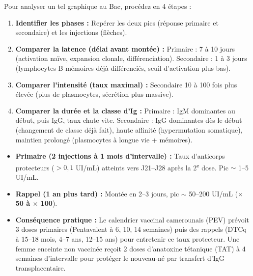 \documentclass[11pt]{article}
\begin{document}
\begin{methode}
Pour analyser un tel graphique au Bac, procédez en 4 étapes :
\begin{enumerate}
\item \textbf{Identifier les phases :} Repérer les deux pics (réponse primaire et secondaire) et les injections (flèches).
\item \textbf{Comparer la latence (délai avant montée) :} Primaire : 7 à 10 jours (activation naïve, expansion clonale, différenciation). Secondaire : 1 à 3 jours (lymphocytes B mémoires déjà différenciés, seuil d'activation plus bas).
\item \textbf{Comparer l'intensité (taux maximal) :} Secondaire 10 à 100 fois plus élevée (plus de plasmocytes, sécrétion plus massive).
\item \textbf{Comparer la durée et la classe d'Ig :} Primaire : IgM dominantes au début, puis IgG, taux chute vite. Secondaire : IgG dominantes dès le début (changement de classe déjà fait), haute affinité (hypermutation somatique), maintien prolongé (plasmocytes à longue vie + mémoires).
\end{enumerate}
\end{methode}

\begin{exemplebox}
\begin{itemize}
\item \textbf{Primaire (2 injections à 1 mois d'intervalle) :} Taux d'anticorps protecteurs ($> 0,1$ UI/mL) atteints vers J21--J28 après la 2\textsuperscript{e} dose. Pic $\sim$ 1--5 UI/mL.
\item \textbf{Rappel (1 an plus tard) :} Montée en 2--3 jours, pic $\sim$ 50--200 UI/mL (\textbf{$\times$ 50 à $\times$ 100}).
\item \textbf{Conséquence pratique :} Le calendrier vaccinal camerounais (PEV) prévoit 3 doses primaires (Pentavalent à 6, 10, 14 semaines) puis des rappels (DTCq à 15--18 mois, 4--7 ans, 12--15 ans) pour entretenir ce taux protecteur. Une femme enceinte non vaccinée reçoit 2 doses d'anatoxine tétanique (TAT) à 4 semaines d'intervalle pour protéger le nouveau-né par transfert d'IgG transplacentaire.
\end{itemize}
\end{exemplebox}
\end{document}
